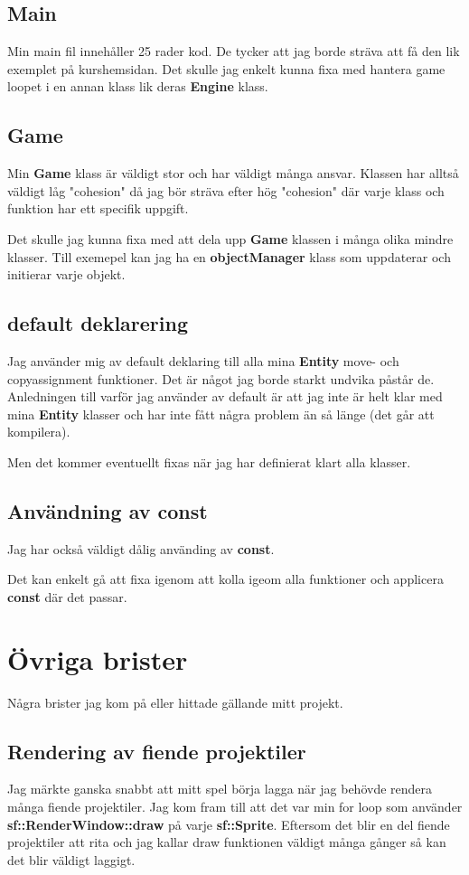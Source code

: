 \documentclass{TDP003mall}
\begin{document}
\subsection{Main}
Min main fil innehåller 25 rader kod. De tycker att jag borde sträva att få den lik exemplet på kurshemsidan.
Det skulle jag enkelt kunna fixa med hantera game loopet i en annan klass lik deras \textbf{Engine} klass.

\subsection{Game}
Min \textbf{Game} klass är väldigt stor och har väldigt många ansvar. Klassen har alltså väldigt låg "cohesion" 
då jag bör sträva efter hög "cohesion" där varje klass och funktion har ett specifik uppgift.

Det skulle jag kunna fixa med att dela upp \textbf{Game} klassen i många olika mindre klasser.
Till exemepel kan jag ha en \textbf{objectManager} klass som uppdaterar och initierar varje objekt.

\subsection{default deklarering}
Jag använder mig av default deklaring till alla mina \textbf{Entity} move- och copyassignment funktioner.
Det är något jag borde starkt undvika påstår de. Anledningen till varför jag använder av default är att jag 
inte är helt klar med mina \textbf{Entity} klasser och har inte fått några problem än så länge (det går att kompilera).

Men det kommer eventuellt fixas när jag har definierat klart alla klasser.

\subsection{Användning av const}
Jag har också väldigt dålig använding av \textbf{const}.

Det kan enkelt gå att fixa igenom att kolla igeom alla funktioner och applicera \textbf{const} där det passar.

\section{Övriga brister}
Några brister jag kom på eller hittade gällande mitt projekt.

\subsection{Rendering av fiende projektiler}
Jag märkte ganska snabbt att mitt spel börja lagga när jag behövde rendera många fiende projektiler.
Jag kom fram till att det var min for loop som använder \textbf{sf::RenderWindow::draw} på varje \textbf{sf::Sprite}.
Eftersom det blir en del fiende projektiler att rita och jag kallar draw funktionen väldigt många gånger så kan det blir väldigt laggigt.
\end{document}
